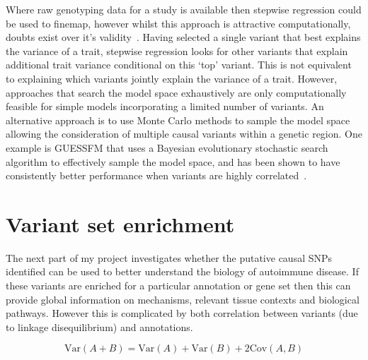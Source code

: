\documentclass[a4paper,11pt]{report}
\begin{document}
Where raw genotyping data for a study is available then stepwise regression could be used to finemap, however whilst this approach is attractive computationally, doubts exist over it's validity~\citep{miller-1984}.  Having selected a single variant that best explains the variance of a trait, stepwise regression  looks for other variants that explain additional trait variance conditional on this `top' variant. This is not equivalent to explaining which variants jointly explain the variance of a trait. However, approaches that search the model space exhaustively are only computationally feasible for simple models incorporating a limited number of variants. An alternative approach is to use Monte Carlo methods to sample the model space allowing the consideration of multiple causal variants within a genetic region. One example is GUESSFM that uses a Bayesian evolutionary stochastic search algorithm to effectively sample the model space, and has been shown to have consistently better performance when variants are highly correlated~\cite{WallaceCutlerPontikosEtAl2015}. 

\section{Variant set enrichment}
\label{sect:vsea}
The next part of my project investigates whether the putative causal SNPs identified can be used to better understand the biology of autoimmune disease.  If these variants  are enriched for a particular annotation or gene set then this can provide global information on mechanisms, relevant tissue contexts and biological pathways. However this is complicated by both correlation between variants (due to linkage disequilibrium) and annotations. 

\begin{equation}
	\text{Var}(A + B) = \text{Var}(A) + \text{Var}(B) + 2\text{Cov}(A,B)
\end{equation}
\end{document}
